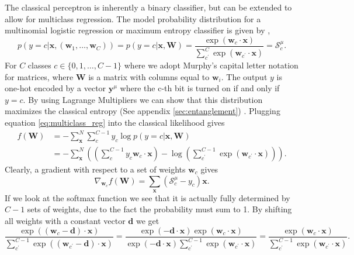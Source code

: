 The classical perceptron is inherently a binary classifier, but can be extended to allow for multiclass regression.
The model probability distribution for a multinomial logistic regression or maximum entropy classifier is given by \cite{Murphy2012},
\begin{equation}
    p(y=c|\mathbf{x}, (\mathbf{w}_1,\ldots,\mathbf{w}_{C})) = p(y=c|\mathbf{x}, \mathbf{W}) = \frac{\exp(\mathbf{w}_c\cdot\mathbf{x})}{\sum_{c^\prime}^C \exp(\mathbf{w}_{c^\prime}\cdot\mathbf{x})} = \mathcal{S}_{c}^\mu \label{eq:multiclass_reg}.
\end{equation}
For $C$ classes $c\in \{0,1,\ldots,C-1\}$ where we adopt Murphy's capital letter notation for matrices, where $ \mathbf{W}$ is a matrix with columns equal to $\mathbf{w}_i$. The output $y$ is one-hot encoded by a vector $\mathbf{y}^\mu$ where the c-th bit is turned on if and only if $y= c$. By using Lagrange Multipliers we can show that this distribution maximizes the classical entropy (See appendix \ref{sec:entanglement}) \cite{Jaynes1957}. Plugging equation \ref{eq:multiclass_reg} into the classical likelihood gives
\begin{align*}
    f(\mathbf{W}) &= -\sum_{\mathbf{x}}^N \sum_c^{C-1} y_c \log p(y=c|\mathbf{x}, \mathbf{W})\\
    &=-\sum_{\mathbf{x}}^N \left(\left(\sum_c^{C-1} y_c \mathbf{w}_c\cdot\mathbf{x} \right) - \log\left( \sum_{c^\prime}^{C-1} \exp(\mathbf{w}_{c^\prime}\cdot\mathbf{x})\right)\right).
\end{align*}
Clearly, a gradient with respect to a set of weights $\mathbf{w}_c$ gives 
\begin{equation*}
    \nabla_{\mathbf{w}_c} f(\mathbf{W})  = \sum_{\mathbf{x}} (\mathcal{S}_{c}^\mu - y_c)\mathbf{x}.
\end{equation*}
If we look at the softmax function we see that it is actually fully determined by $C-1$ sets of weights, due to the fact the probability must sum to 1. By shifting all weights with a constant vector $\mathbf{d}$ we get
\begin{equation*}
    \frac{\exp((\mathbf{w}_c - \mathbf{d})\cdot\mathbf{x})}{\sum_{c^\prime}^{C-1} \exp((\mathbf{w}_{c^\prime}- \mathbf{d})\cdot\mathbf{x})} = \frac{\exp(-\mathbf{d}\cdot\mathbf{x})\exp(\mathbf{w}_c\cdot\mathbf{x})}{\exp(-\mathbf{d}\cdot\mathbf{x})\sum_{c^\prime}^{C-1} \exp(\mathbf{w}_{c^\prime}\cdot\mathbf{x})} = \frac{\exp(\mathbf{w}_c\cdot\mathbf{x})}{\sum_{c^\prime}^{C-1} \exp(\mathbf{w}_{c^\prime}\cdot\mathbf{x})}.
\end{equation*}
